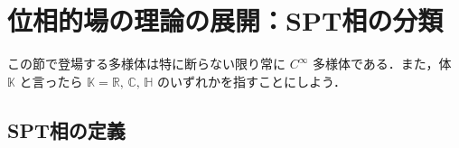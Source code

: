 \documentclass[TQFT_main]{subfiles}
\begin{document}
\setcounter{chapter}{2}

\chapter{位相的場の理論の展開：SPT相の分類}

この節で登場する多様体は特に断らない限り常に $C^\infty$ 多様体である．また，体 $\mathbb{K}$ と言ったら $\mathbb{K} = \mathbb{R},\, \mathbb{C},\, \mathbb{H}$ のいずれかを指すことにしよう．

\section{SPT相の定義}
\end{document}
